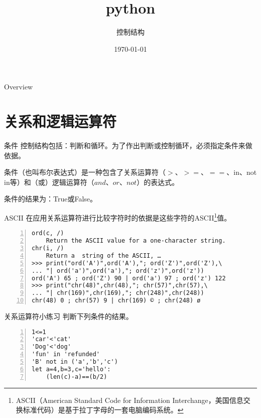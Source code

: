 \documentclass{beamer}
\title[Django]{python} %
\subtitle{控制结构}
\author{} %
\institute[计算机科学与技术学院] %
{
贵州大学 \\ %
\medskip
\textit{hnzhang1@gzu.edu.cn} %
}
\date{\today} %
\begin{document}
\begin{frame}
\titlepage %
\end{frame}
\begin{frame}{Overview}
\tableofcontents
\end{frame}
\section{关系和逻辑运算符}
\begin{frame}{条件}
控制结构包括：判断和循环。为了作出判断或控制循环，必须指定条件来做依据。

条件（也叫布尔表达式）是一种包含了关系运算符（$>$、$>=$、$==$、in、not in等）和（或）逻辑运算符（$and$、$or$、$not$）的表达式。

条件的结果为：True或False。
\end{frame}
\begin{frame}[fragile]{ASCII}
在应用关系运算符进行比较字符时的依据是这些字符的ASCII\footnote{ASCII（American Standard Code for Information Interchange，美国信息交换标准代码）是基于拉丁字母的一套电脑编码系统。}值。
\begin{block}{}
\begin{Verbatim}[numbers=left,frame=single,rulecolor=\color{red}]
ord(c, /)
    Return the ASCII value for a one-character string.
chr(i, /)
    Return a  string of the ASCII, …
>>> print("ord('A')",ord('A'),"; ord('Z')",ord('Z'),\
... "| ord('a')",ord('a'),"; ord('z')",ord('z'))
ord('A') 65 ; ord('Z') 90 | ord('a') 97 ; ord('z') 122
>>> print("chr(48)",chr(48),"; chr(57)",chr(57),\
... "| chr(169)",chr(169),"; chr(248)",chr(248))
chr(48) 0 ; chr(57) 9 | chr(169) © ; chr(248) ø
\end{Verbatim}
\end{block}

\end{frame}

\begin{frame}[fragile]{关系运算符小练习}
判断下列条件的结果。
\begin{Verbatim}[numbers=left,frame=single,rulecolor=\color{red}]
1<=1
'car'<'cat'
'Dog'<'dog'
'fun' in 'refunded'
'B' not in ('a','b','c')
let a=4,b=3,c='hello':
    (len(c)-a)==(b/2)
\end{Verbatim}
\end{frame}
\end{document}
